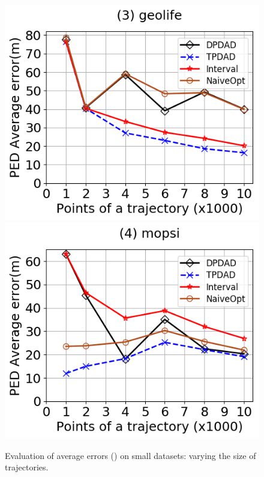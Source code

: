 \begin{figure}[tb!]
	\includegraphics[scale=0.315]{Figures/Exp-DAD-pedAveErr-size-geolife.png}	\hspace{1ex}
	\includegraphics[scale=0.315]{Figures/Exp-DAD-pedAveErr-size-mopsi.png}	
	\vspace{-3ex}
	\caption{\small Evaluation of average errors (\dad) on small datasets: varying the size of trajectories.}
	\label{fig:ae-dad-ped-size}
	\vspace{-2ex}
\end{figure}

